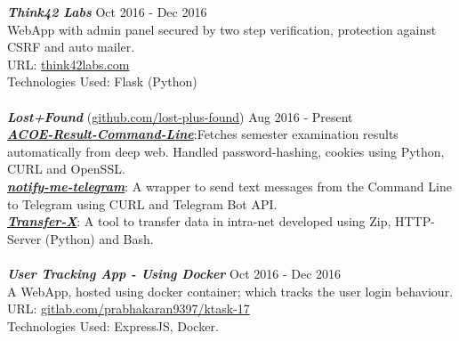\documentclass[10pt,a4paper,sans	]{moderncv}        %
\begin{document}
{\textit{\textbf{Think42 Labs}} \hfill Oct 2016 - Dec 2016 \\
WebApp with admin panel secured by two step verification, protection against CSRF and auto mailer.\\
URL: \href{http://think42labs.com}{think42labs.com} \\
Technologies Used: Flask (Python)\\
\\
{\textit{\textbf{Lost+Found}}} (\href{https://github.com/lost-plus-found}{github.com/lost-plus-found}) \hfill Aug 2016 - Present \\
\textit{\href{https://github.com/lost-plus-found/ACOE-Result-Command-Line}{\textbf{ACOE-Result-Command-Line}}}:Fetches semester examination results automatically from deep web. Handled password-hashing, cookies using Python, CURL and OpenSSL.\\
\textit{\href{https://github.com/lost-plus-found/notify-me-telegram}{\textbf{notify-me-telegram}}}: A wrapper to send text messages from the Command Line to Telegram using CURL and Telegram Bot API.\\
\textit{\href{https://github.com/lost-plus-found/transfer-x}{\textbf{Transfer-X}}}: A tool to transfer data in intra-net developed using Zip, HTTP-Server (Python) and Bash.\\
\\
{\textit{\textbf{User Tracking App - Using Docker}} \hfill Oct 2016 - Dec 2016 \\
A WebApp, hosted using docker container; which tracks the user login behaviour.\\
URL: \href{https://gitlab.com/prabhakaran9397/ktask-17}{gitlab.com/prabhakaran9397/ktask-17} \\
Technologies Used: ExpressJS, Docker.
}}
\end{document}
